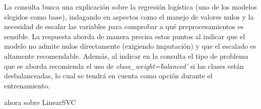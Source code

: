 \documentclass[12pt,a4paper,oneside]{book}
\begin{document}
\begin{iaanalisis}
La consulta busca una explicación sobre la regresión logística (uno de los modelos elegidos como base), indagando en aspectos como el manejo de valores nulos y la necesidad de escalar las variables para comprobar a qué preprocesamientos es sensible. La respuesta aborda de manera precisa estos puntos al indicar que el modelo no admite nulos directamente (exigiendo imputación) y que el escalado es altamente recomendable. Además, al indicar en la consulta el tipo de problema que se aborda recomienda el uso de \textit{class\_weight=\'balanced\'} si las clases están desbalanceadas, lo cual se tendrá en cuenta como opción durante el entrenamiento. 
\end{iaanalisis}




\begin{iaprompt}
ahora sobre LinearSVC
\end{iaprompt}
\end{document}
